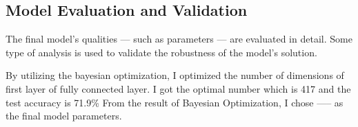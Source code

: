 \subsection{Model Evaluation and Validation}
The final model’s qualities — such as parameters — are evaluated in detail. Some type of analysis is used to validate the robustness of the model’s solution.

By utilizing the bayesian optimization, I optimized the number of dimensions of first layer of fully connected layer. I got the optimal number which is 417 and the test accuracy is 71.9\%
From the result of Bayesian Optimization, I chose ----- as the final model parameters.

